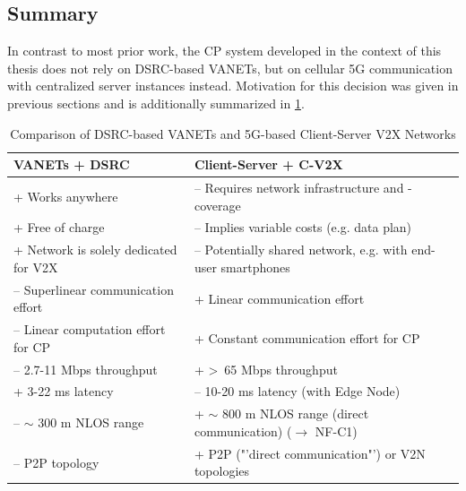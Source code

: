 \subsection{Summary}
\label{subsec:concept_design:5g:summary}
In contrast to most prior work, the CP system developed in the context of this thesis does not rely on DSRC-based VANETs, but on cellular 5G communication with centralized server instances instead. Motivation for this decision was given in previous sections and is additionally summarized in \cref{tab:5g_dsrc_comparison}.

\begin{table}[H]
	\begin{tabular}{|p{7.6cm}|p{7.6cm}|}
		\hline
		\textbf{VANETs + DSRC}                & \textbf{Client-Server + C-V2X}                                                 \\ \hline
		\rowcolor[HTML]{9AFF99} 
		+ Works anywhere                      & \cellcolor[HTML]{FFCCC9}– Requires network infrastructure and -coverage              \\ \hline
		\rowcolor[HTML]{9AFF99} 
		+ Free of charge                      & \cellcolor[HTML]{FFCCC9}– Implies variable costs (e.g. data plan)                    \\ \hline
		\rowcolor[HTML]{9AFF99} 
		+ Network is solely dedicated for V2X & \cellcolor[HTML]{FFCCC9}– Potentially shared network, e.g. with end-user smartphones \\ \hline
		\rowcolor[HTML]{FFCCC9} 
		– Superlinear communication effort    & \cellcolor[HTML]{9AFF99}+ Linear communication effort                                \\ \hline
		\rowcolor[HTML]{FFCCC9} 
		– Linear computation effort for CP    & \cellcolor[HTML]{9AFF99}+ Constant communication effort for CP                       \\ \hline
		\rowcolor[HTML]{FFCCC9} 
		– 2.7-11 Mbps throughput \cite{Chen2016, Wang2013}              & \cellcolor[HTML]{9AFF99}+ \textgreater \ 65 Mbps throughput \cite{Kavanagh2019, wiki:5g}                          \\ \hline
		\rowcolor[HTML]{9AFF99} 
		+ 3-22 ms latency \cite{Rauch2011}                     & \cellcolor[HTML]{FFCCC9}– 10-20 ms latency (with Edge Node) \cite{wiki:5g, QualcommTechnologiesInc.2018}                          \\ \hline
		\rowcolor[HTML]{FFCCC9} 
		– $\sim$ 300 m NLOS range \cite{5GAutomotiveAssociation2018}              & \cellcolor[HTML]{9AFF99}+ $\sim$ 800 m NLOS range (direct communication) \cite{5GAutomotiveAssociation2018} ($\rightarrow$ NF-C1)                                     \\ \hline
		\rowcolor[HTML]{FFCCC9} 
		– P2P topology                        & \cellcolor[HTML]{9AFF99}+ P2P ("'direct communication"') or V2N topologies             \\ \hline            
	\end{tabular}
	\caption{Comparison of DSRC-based VANETs and 5G-based Client-Server V2X Networks}
	\label{tab:5g_dsrc_comparison}
\end{table}

